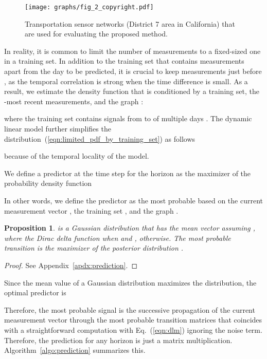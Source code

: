 \documentclass[journal]{IEEEtran}
\newtheorem{prop}{Proposition}
\begin{document}
\begin{figure}[!t]
\centering
 {{\texttt{[image: graphs/fig\_2\_copyright.pdf]}}}
\caption{Transportation sensor networks (District 7 area in California) that are used for evaluating the proposed method.}\label{fig:test_sites}
\end{figure}

In reality, it is common to limit the number of measurements to a fixed-sized one in a training set. 
In addition to the training set that contains measurements apart from the day to be predicted, it is crucial to keep measurements just before , as the temporal correlation is strong when the time difference is small.
As a result, we estimate the density function that is conditioned by a training set, the -most recent measurements, and the graph :

where the training set  contains signals from  to  of multiple days .
The dynamic linear model further simplifies the distribution~(\ref{eqn:limited_pdf_by_training_set}) as follows

because of the temporal locality of the model.

We define a predictor  at the time step  for the horizon  as the maximizer of the probability density function
 
In other words, we define the predictor  as the most probable  based on the current measurement vector , the training set , and the graph .


\begin{prop}\label{prop:1}
 is a Gaussian distribution that has the mean vector  assuming , where the Dirac delta function  when  and , otherwise. The most probable transition  is the maximizer of the posterior distribution .
\end{prop}
\begin{proof}
See Appendix~\ref{apdx:prediction}.
\end{proof}
Since the mean value of a Gaussian distribution maximizes the distribution, the optimal predictor is

Therefore, the most probable signal  is the successive propagation of the current measurement vector  through the most probable transition matrices 
that coincides with a straightforward computation with Eq.~(\ref{eqn:dlm}) ignoring the noise term. Therefore, the prediction for any horizon is just a matrix multiplication.
Algorithm~\ref{algo:prediction} summarizes this.
\end{document}
